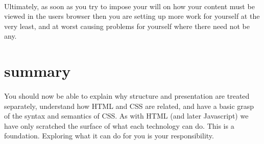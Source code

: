 \paragraph{} Ultimately, as soon as you try to impose your will on how your content must be viewed in the users browser then you are setting up more work for yourself at the very least, and at worst causing problems for yourself where there need not be any.

\section{summary}
\paragraph{} You should now be able to explain why structure and presentation are treated separately, understand how HTML and CSS are related, and have a basic grasp of the syntax and semantics of CSS. As with HTML (and later Javascript) we have only scratched the surface of what each technology can do. This is a foundation. Exploring what it can do for you is your responsibility.

